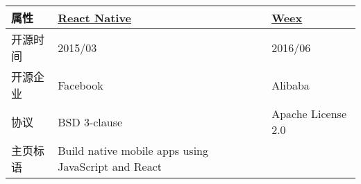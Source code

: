 \begin{longtable}[]{@{}lll@{}}
\toprule
\begin{minipage}[b]{0.30\columnwidth}\raggedright\strut
属性\strut
\end{minipage} & \begin{minipage}[b]{0.30\columnwidth}\raggedright\strut
\href{https://github.com/facebook/react-native}{React Native}\strut
\end{minipage} & \begin{minipage}[b]{0.30\columnwidth}\raggedright\strut
\href{https://github.com/apache/incubator-weex/}{Weex}\strut
\end{minipage}\tabularnewline
\midrule
\endhead
\begin{minipage}[t]{0.30\columnwidth}\raggedright\strut
开源时间\strut
\end{minipage} & \begin{minipage}[t]{0.30\columnwidth}\raggedright\strut
2015/03\strut
\end{minipage} & \begin{minipage}[t]{0.30\columnwidth}\raggedright\strut
2016/06\strut
\end{minipage}\tabularnewline
\begin{minipage}[t]{0.30\columnwidth}\raggedright\strut
开源企业\strut
\end{minipage} & \begin{minipage}[t]{0.30\columnwidth}\raggedright\strut
Facebook\strut
\end{minipage} & \begin{minipage}[t]{0.30\columnwidth}\raggedright\strut
Alibaba\strut
\end{minipage}\tabularnewline
\begin{minipage}[t]{0.30\columnwidth}\raggedright\strut
协议\strut
\end{minipage} & \begin{minipage}[t]{0.30\columnwidth}\raggedright\strut
BSD 3-clause\strut
\end{minipage} & \begin{minipage}[t]{0.30\columnwidth}\raggedright\strut
Apache License 2.0\strut
\end{minipage}\tabularnewline
\begin{minipage}[t]{0.30\columnwidth}\raggedright\strut
主页标语\strut
\end{minipage} & \begin{minipage}[t]{0.30\columnwidth}\raggedright\strut
Build native mobile apps using JavaScript and React\strut
\end{minipage} & \begin{minipage}[t]{0.30\columnwidth}\raggedright\strut

\end{minipage}
\end{longtable}
